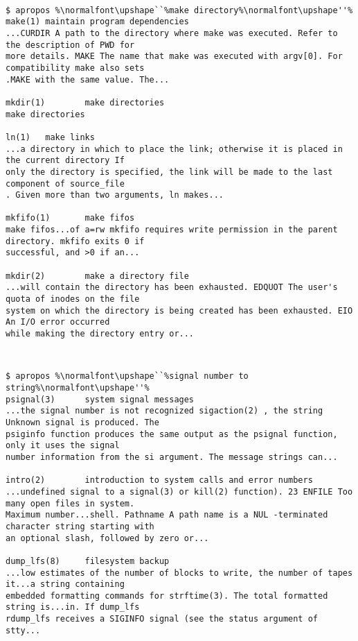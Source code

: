 \documentclass[letterpaper,twocolumn,10pt]{article}
\begin{document}
{\tt \small
{}
\begin{lstlisting}[float=*]
$ apropos %\normalfont\upshape``%make directory%\normalfont\upshape''%
make(1) maintain program dependencies
...CURDIR A path to the directory where make was executed. Refer to the description of PWD for
more details. MAKE The name that make was executed with argv[0]. For compatibility make also sets
.MAKE with the same value. The...

mkdir(1)        make directories
make directories

ln(1)   make links
...a directory in which to place the link; otherwise it is placed in the current directory If
only the directory is specified, the link will be made to the last component of source_file
. Given more than two arguments, ln makes...

mkfifo(1)       make fifos
make fifos...of a=rw mkfifo requires write permission in the parent directory. mkfifo exits 0 if
successful, and >0 if an...

mkdir(2)        make a directory file
...will contain the directory has been exhausted. EDQUOT The user's quota of inodes on the file
system on which the directory is being created has been exhausted. EIO An I/O error occurred
while making the directory entry or...
\end{lstlisting}
}

{\tt \small
{}
\begin{lstlisting}[float=*]
$ apropos %\normalfont\upshape``%signal number to string%\normalfont\upshape''%
psignal(3)      system signal messages
...the signal number is not recognized sigaction(2) , the string Unknown signal is produced. The
psiginfo function produces the same output as the psignal function, only it uses the signal
number information from the si argument. The message strings can...

intro(2)        introduction to system calls and error numbers
...undefined signal to a signal(3) or kill(2) function). 23 ENFILE Too many open files in system.
Maximum number...shell. Pathname A path name is a NUL -terminated character string starting with
an optional slash, followed by zero or...

dump_lfs(8)     filesystem backup
...low estimates of the number of blocks to write, the number of tapes it...a string containing
embedded formatting commands for strftime(3). The total formatted string is...in. If dump_lfs
rdump_lfs receives a SIGINFO signal (see the status argument of stty...
\end{lstlisting}
}
\end{document}
